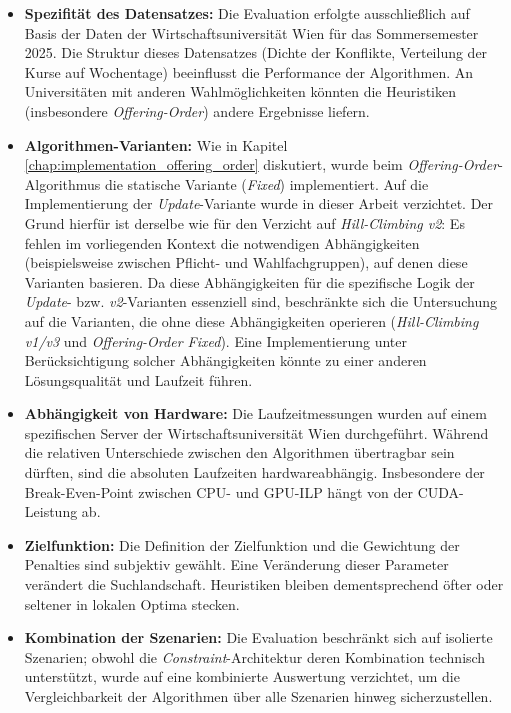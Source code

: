 \begin{itemize}
  \item \textbf{Spezifität des Datensatzes:} Die Evaluation erfolgte ausschließlich auf Basis der Daten der Wirtschaftsuniversität Wien für das Sommersemester 2025. Die Struktur dieses Datensatzes (Dichte der Konflikte, Verteilung der Kurse auf Wochentage) beeinflusst die Performance der Algorithmen. An Universitäten mit anderen Wahlmöglichkeiten könnten die Heuristiken (insbesondere \textit{Offering-Order}) andere Ergebnisse liefern.
  \item \textbf{Algorithmen-Varianten:} Wie in Kapitel \ref{chap:implementation_offering_order} diskutiert, wurde beim \textit{Offering-Order}-Algorithmus die statische Variante (\textit{Fixed}) implementiert. Auf die Implementierung der \textit{Update}-Variante wurde in dieser Arbeit verzichtet. Der Grund hierfür ist derselbe wie für den Verzicht auf \textit{Hill-Climbing v2}: Es fehlen im vorliegenden Kontext die notwendigen Abhängigkeiten (beispielsweise zwischen Pflicht- und Wahlfachgruppen), auf denen diese Varianten basieren. Da diese Abhängigkeiten für die spezifische Logik der \textit{Update}- bzw. \textit{v2}-Varianten essenziell sind, beschränkte sich die Untersuchung auf die Varianten, die ohne diese Abhängigkeiten operieren (\textit{Hill-Climbing v1/v3} und \textit{Offering-Order Fixed}). Eine Implementierung unter Berücksichtigung solcher Abhängigkeiten könnte zu einer anderen Lösungsqualität und Laufzeit führen.
  \item \textbf{Abhängigkeit von Hardware:} Die Laufzeitmessungen wurden auf einem spezifischen Server der Wirtschaftsuniversität Wien durchgeführt. Während die relativen Unterschiede zwischen den Algorithmen übertragbar sein dürften, sind die absoluten Laufzeiten hardwareabhängig. Insbesondere der Break-Even-Point zwischen CPU- und GPU-ILP hängt von der CUDA-Leistung ab.
  \item \textbf{Zielfunktion:} Die Definition der Zielfunktion und die Gewichtung der Penalties sind subjektiv gewählt. Eine Veränderung dieser Parameter verändert die Suchlandschaft. Heuristiken bleiben dementsprechend öfter oder seltener in lokalen Optima stecken.
  \item \textbf{Kombination der Szenarien:} Die Evaluation beschränkt sich auf isolierte Szenarien; obwohl die \textit{Constraint}-Architektur deren Kombination technisch unterstützt, wurde auf eine kombinierte Auswertung verzichtet, um die Vergleichbarkeit der Algorithmen über alle Szenarien hinweg sicherzustellen.
\end{itemize}
